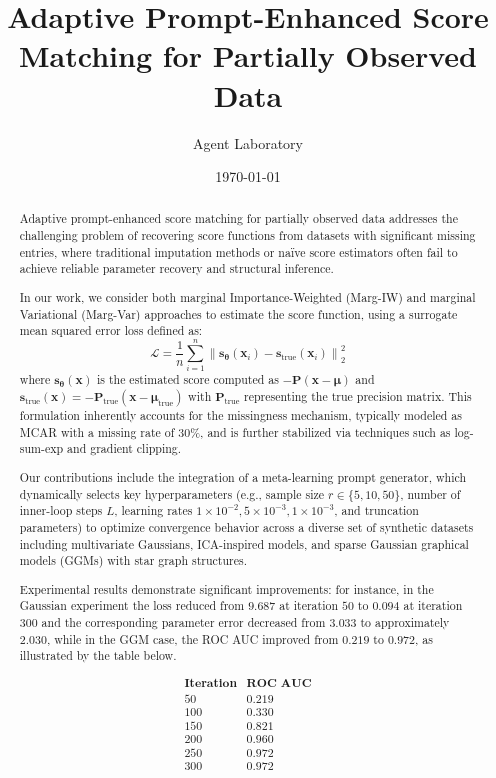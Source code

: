 \documentclass{article} %
\title{Adaptive Prompt-Enhanced Score Matching for Partially Observed Data}
\author{Agent Laboratory}
\date{\today}
\begin{document}
\maketitle

\begin{abstract}
Adaptive prompt-enhanced score matching for partially observed data addresses the challenging problem of recovering score functions from datasets with significant missing entries, where traditional imputation methods or naïve score estimators often fail to achieve reliable parameter recovery and structural inference.

In our work, we consider both marginal Importance-Weighted (Marg-IW) and marginal Variational (Marg-Var) approaches to estimate the score function, using a surrogate mean squared error loss defined as:
$$
\mathcal{L} = \frac{1}{n}\sum_{i=1}^{n}\left\|\mathbf{s}_{\mathbf{\theta}}(\mathbf{x}_i) - \mathbf{s}_{\text{true}}(\mathbf{x}_i)\right\|_2^2
$$
where $\mathbf{s}_{\mathbf{\theta}}(\mathbf{x})$ is the estimated score computed as $-\mathbf{P}(\mathbf{x}-\mathbf{\mu})$ and $\mathbf{s}_{\text{true}}(\mathbf{x}) = -\mathbf{P}_{\text{true}}(\mathbf{x}-\mathbf{\mu}_{\text{true}})$ with $\mathbf{P}_{\text{true}}$ representing the true precision matrix. This formulation inherently accounts for the missingness mechanism, typically modeled as MCAR with a missing rate of 30\%, and is further stabilized via techniques such as log-sum-exp and gradient clipping.

Our contributions include the integration of a meta-learning prompt generator, which dynamically selects key hyperparameters (e.g., sample size $r \in \{5, 10, 50\}$, number of inner-loop steps $L$, learning rates $1\times10^{-2}, 5\times10^{-3}, 1\times10^{-3}$, and truncation parameters) to optimize convergence behavior across a diverse set of synthetic datasets including multivariate Gaussians, ICA-inspired models, and sparse Gaussian graphical models (GGMs) with star graph structures.

Experimental results demonstrate significant improvements: for instance, in the Gaussian experiment the loss reduced from $9.687$ at iteration $50$ to $0.094$ at iteration $300$ and the corresponding parameter error decreased from $3.033$ to approximately $2.030$, while in the GGM case, the ROC AUC improved from $0.219$ to $0.972$, as illustrated by the table below.

\[
\begin{array}{c|c}
\textbf{Iteration} & \textbf{ROC AUC} \\ \hline
50 & 0.219 \\
100 & 0.330 \\
150 & 0.821 \\
200 & 0.960 \\
250 & 0.972 \\
300 & 0.972
\end{array}
\]


\end{abstract}
\end{document}
